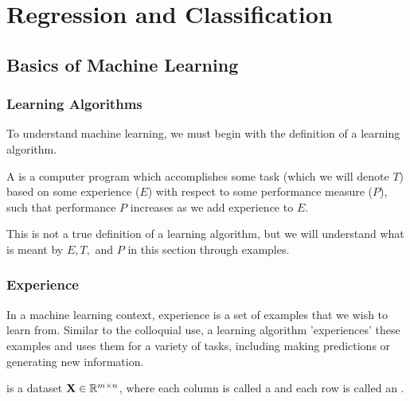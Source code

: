 

\chapter{Regression and Classification} 

\section{Basics of Machine Learning}
\subsection{Learning Algorithms}\label{learning-algs}

To understand machine learning, we must begin with the definition of a learning algorithm.

\begin{definition}
A  is a computer program which accomplishes some task (which we will denote $T$) based on some experience ($E$) with respect to some performance measure ($P$), such that performance $P$ increases as we add experience to $E$.
\end{definition}

\begin{remark}
    This is not a true definition of a learning algorithm, but we will understand what is meant by $E, T,$ and $P$ in this section through examples.
\end{remark}

\subsection{Experience}

In a machine learning context, experience is a set of examples that we wish to learn from. Similar to the colloquial use, a learning algorithm 'experiences' these examples and uses them for a variety of tasks, including making predictions or generating new information. 

\begin{definition}
  is a dataset $\MX\in\mathbb{R}^{m \times n}$, where each column is called a  and each row is called an . 
\end{definition}

